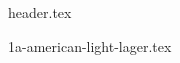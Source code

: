 \clearpage
{}
\divisorLine

{header.tex}

\begin{multicols}{2}

{1a-american-light-lager.tex}

\end{multicols}